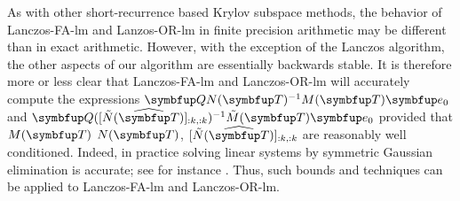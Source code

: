 As with other short-recurrence based Krylov subspace methods, the behavior of Lanczos-FA-lm and Lanzos-OR-lm in finite precision arithmetic may be different than in exact arithmetic.
However, with the exception of the Lanczos algorithm, the other aspects of our algorithm are essentially backwards stable.
It is therefore more or less clear that Lanczos-FA-lm and Lanczos-OR-lm will accurately compute the expressions $\vec{Q} N\mf{\vec{T}}^{-1} M\mf{\vec{T}} \vec{e}_0$ and $\vec{Q}  ([\tilde{N}\mf{\widehat{\vec{T}}}]_{:k,:k})^{-1} \tilde{M}\mf{\vec{T}} \vec{e}_0$ provided that $M\mf{\vec{T}}$ $N\mf{\vec{T}}$, $[\tilde{N}\mf{\widehat{\vec{T}}}]_{:k,:k}$ are reasonably well conditioned.
Indeed, in practice solving linear systems by symmetric Gaussian elimination is accurate; see for instance \cite[Chapter 10]{higham_02}.
Thus, such bounds and techniques can be applied to Lanczos-FA-lm and Lanczos-OR-lm.

